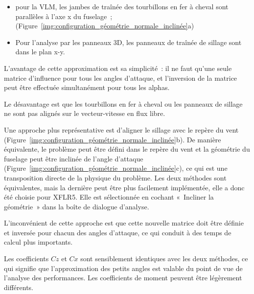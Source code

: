 \documentclass[a4paper,twoside,12pt,dvips]{article}
\begin{document}
\begin{itemize}
	\item pour la VLM, les jambes de traînée des tourbillons en fer à cheval 
	sont parallèles à l’axe x du fuselage~;
	(Figure~\ref{img:configuration_géométrie_normale_inclinée}a)
	\item Pour l’analyse par les panneaux 3D, les panneaux de traînée de sillage 
	sont dans le plan x-y.
\end{itemize}

L’avantage de cette approximation est sa simplicité~: il ne faut qu’une seule
matrice d’influence pour tous les angles d’attaque, et l’inversion de la matrice peut être effectuée simultanément pour tous les alphas.

Le désavantage est que les tourbillons en fer à cheval ou les panneaux de sillage ne sont pas alignés sur le vecteur-vitesse en flux libre.

Une approche plus représentative est d’aligner le sillage avec le repère du vent (Figure~\ref{img:configuration_géométrie_normale_inclinée}b). De manière équivalente, le problème peut être défini dans le repère du vent et la géométrie du fuselage peut être inclinée de l’angle d’attaque 
(Figure~\ref{img:configuration_géométrie_normale_inclinée}c), ce qui est une transposition directe de la physique du problème. Les deux méthodes sont équivalentes, mais la dernière peut être plus facilement implémentée, elle a donc été choisie pour XFLR5. Elle est sélectionnée en cochant «~Incliner la géométrie~» dans la boîte de dialogue d’analyse.

L’inconvénient de cette approche est que cette nouvelle matrice doit être 
définie et inversée pour chacun des angles d’attaque, ce qui conduit à des
temps de calcul plus importants.

Les coefficients $Cz$ et $Cx$ sont sensiblement identiques avec les deux 
méthodes, ce qui signifie que l’approximation des petits angles est valable
du point de vue de l’analyse des performances. Les coefficients de moment
peuvent être légèrement différents.
\end{document}
